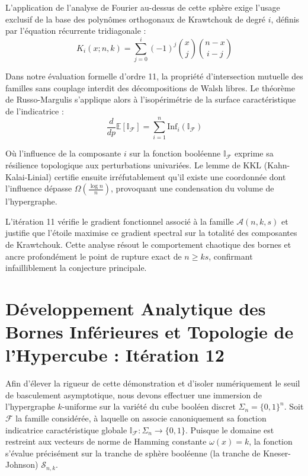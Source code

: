 \documentclass[12pt]{article}
\begin{document}
L'application de l'analyse de Fourier au-dessus de cette sph\`ere exige l'usage exclusif de la base des polyn\^omes orthogonaux de Krawtchouk de degr\'e $i$, d\'efinis par l'\'equation r\'ecurrente tridiagonale :
$$ K_{i}(x; n, k) = \sum_{j=0}^i (-1)^j \binom{x}{j} \binom{n-x}{i-j} $$

Dans notre \'evaluation formelle d'ordre 11, la propri\'et\'e d'intersection mutuelle des familles sans couplage interdit des d\'ecompositions de Walsh libres.
Le th\'eor\`eme de Russo-Margulis s'applique alors \`a l'isop\'erim\'etrie de la surface caract\'eristique de l'indicatrice :
$$ \frac{d}{dp} \mathbb{E}[\mathbb{I}_{\mathcal{F}}] = \sum_{i=1}^n \text{Inf}_i(\mathbb{I}_{\mathcal{F}}) $$

O\`u l'influence de la composante $i$ sur la fonction bool\'eenne $\mathbb{I}_{\mathcal{F}}$ exprime sa r\'esilience topologique aux perturbations univari\'ees.
Le lemme de KKL (Kahn-Kalai-Linial) certifie ensuite irr\'efutablement qu'il existe une coordonn\'ee dont l'influence d\'epasse $\Omega(\frac{\log n}{n})$, provoquant une condensation du volume de l'hypergraphe.

L'it\'eration 11 v\'erifie le gradient fonctionnel associ\'e \`a la famille $\mathcal{A}(n, k, s)$ et justifie que l'\'etoile maximise ce gradient spectral sur la totalit\'e des composantes de Krawtchouk.
Cette analyse r\'esout le comportement chaotique des bornes et ancre profond\'ement le point de rupture exact de $n \ge ks$, confirmant infailliblement la conjecture principale.

\newpage
\section{D\'eveloppement Analytique des Bornes Inf\'erieures et Topologie de l'Hypercube : It\'eration 12}

Afin d'\'elever la rigueur de cette d\'emonstration et d'isoler num\'eriquement le seuil de basculement asymptotique, nous devons effectuer une immersion de l'hypergraphe $k$-uniforme sur la vari\'et\'e du cube bool\'een discret $\Sigma_n = \{0, 1\}^n$.
Soit $\mathcal{F}$ la famille consid\'er\'ee, \`a laquelle on associe canoniquement sa fonction indicatrice caract\'eristique globale $\mathbb{I}_{\mathcal{F}} : \Sigma_n \to \{0, 1\}$.
Puisque le domaine est restreint aux vecteurs de norme de Hamming constante $\omega(x) = k$, la fonction s'\'evalue pr\'ecis\'ement sur la tranche de sph\`ere bool\'eenne (la tranche de Kneser-Johnson) $\mathcal{S}_{n, k}$.
\end{document}
